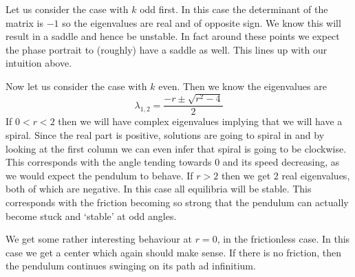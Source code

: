 Let us consider the case with $k$ odd first. In this case the determinant of the matrix is $-1$ so the eigenvalues are real and of opposite sign. We know this will result in a saddle and hence be unstable. In fact around these points we expect the phase portrait to (roughly) have a saddle as well. This lines up with our intuition above.

Now let us consider the case with $k$ even. Then we know the eigenvalues are
$$ \lambda_{1, 2} = \frac{-r \pm \sqrt{r^2 - 4}}{2} $$
If $0 < r < 2$ then we will have complex eigenvalues implying that we will have a spiral. Since the real part is positive, solutions are going to spiral in and by looking at the first column we can even infer that spiral is going to be clockwise. This corresponds with the angle tending towards 0 and its speed decreasing, as we would expect the pendulum to behave. If $r > 2$ then we get 2 real eigenvalues, both of which are negative. In this case all equilibria will be stable. This corresponds with the friction becoming so strong that the pendulum can actually become stuck and `stable' at odd angles. 

We get some rather interesting behaviour at $r = 0$, in the frictionless case. In this case we get a center which again should make sense. If there is no friction, then the pendulum continues swinging on its path ad infinitium. 